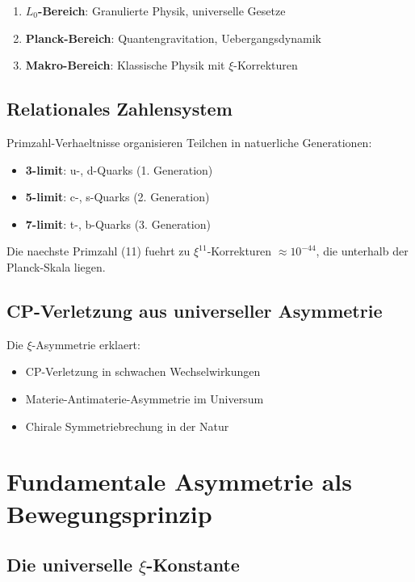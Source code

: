 \documentclass[12pt,a4paper]{article}
\newcommand{\xipar}{\xi}
\newcommand{\Lzero}{L_0}
\theoremstyle{definition}
\theoremstyle{remark}
\begin{document}
	\begin{enumerate}
		\item \textbf{$\Lzero$-Bereich}: Granulierte Physik, universelle Gesetze
		\item \textbf{Planck-Bereich}: Quantengravitation, Uebergangsdynamik
		\item \textbf{Makro-Bereich}: Klassische Physik mit $\xipar$-Korrekturen
	\end{enumerate}
	
	\subsection{Relationales Zahlensystem}
	
	Primzahl-Verhaeltnisse organisieren Teilchen in natuerliche Generationen:
	
	\begin{itemize}
		\item \textbf{3-limit}: u-, d-Quarks (1. Generation)
		\item \textbf{5-limit}: c-, s-Quarks (2. Generation)
		\item \textbf{7-limit}: t-, b-Quarks (3. Generation)
	\end{itemize}
	
	Die naechste Primzahl (11) fuehrt zu $\xipar^{11}$-Korrekturen $\approx 10^{-44}$, die unterhalb der Planck-Skala liegen.
	
	\subsection{CP-Verletzung aus universeller Asymmetrie}
	
	Die $\xipar$-Asymmetrie erklaert:
	\begin{itemize}
		\item CP-Verletzung in schwachen Wechselwirkungen
		\item Materie-Antimaterie-Asymmetrie im Universum
		\item Chirale Symmetriebrechung in der Natur
	\end{itemize}
	
	\section{Fundamentale Asymmetrie als Bewegungsprinzip}
	
	\subsection{Die universelle $\xipar$-Konstante}
	
\end{document}
